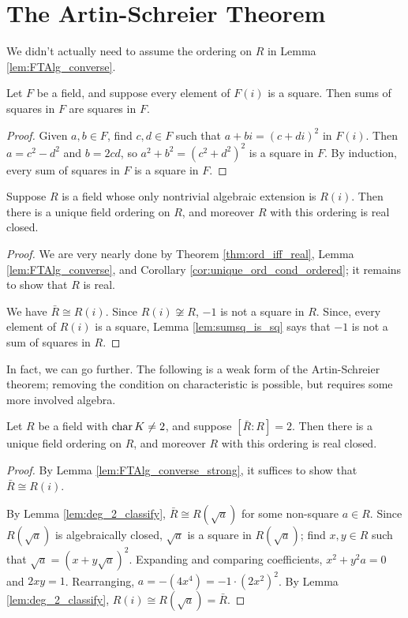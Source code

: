 \section{The Artin-Schreier Theorem}

We didn't actually need to assume the ordering on $R$ in Lemma \ref{lem:FTAlg_converse}.

\begin{lemma}
  \label{lem:sumsq_is_sq}
  Let $F$ be a field, and suppose every element of $F(i)$ is a square. Then sums of squares in $F$ are squares in $F$.
\end{lemma}
\begin{proof}
  Given $a,b\in F$, find $c,d\in F$ such that $a+bi=(c+di)^2$ in $F(i)$. Then $a=c^2-d^2$ and $b=2cd$, so $a^2+b^2=(c^2+d^2)^2$ is a square in $F$. By induction, every sum of squares in $F$ is a square in $F$.
\end{proof}

\begin{lemma}
  \label{lem:FTAlg_converse_strong}
  Suppose $R$ is a field whose only nontrivial algebraic extension is $R(i)$. Then there is a unique field ordering on $R$, and moreover $R$ with this ordering is real closed.
\end{lemma}
\begin{proof}
  We are very nearly done by Theorem \ref{thm:ord_iff_real}, Lemma \ref{lem:FTAlg_converse}, and Corollary \ref{cor:unique_ord_cond_ordered}; it remains to show that $R$ is real.

  We have $\bar{R}\cong R(i)$. Since $R(i)\not\cong R$, $-1$ is not a square in $R$. Since, every element of $R(i)$ is a square, Lemma \ref{lem:sumsq_is_sq} says that $-1$ is not a sum of squares in $R$.
\end{proof}

In fact, we can go further. The following is a weak form of the Artin-Schreier theorem; removing the condition on characteristic is possible, but requires some more involved algebra.

\begin{theorem}
  \label{thm:Artin-Schreier_weak}
  Let $R$ be a field with $\operatorname{char} K\neq2$, and suppose $[\bar{R}:R]=2$. Then there is a unique field ordering on $R$, and moreover $R$ with this ordering is real closed.
\end{theorem}
\begin{proof}
  By Lemma \ref{lem:FTAlg_converse_strong}, it suffices to show that $\bar{R}\cong R(i)$.

  By Lemma \ref{lem:deg_2_classify}, $\bar{R}\cong R(\sqrt{a})$ for some non-square $a\in R$. Since $R(\sqrt{a})$ is algebraically closed, $\sqrt{a}$ is a square in $R(\sqrt{a})$; find $x,y\in R$ such that $\sqrt{a}=(x+y\sqrt{a})^2$. Expanding and comparing coefficients, $x^2+y^2a=0$ and $2xy=1$. Rearranging, $a=-(4x^4)=-1\cdot(2x^2)^2$. By Lemma \ref{lem:deg_2_classify}, $R(i)\cong R(\sqrt{a})=\bar{R}$.
\end{proof}

